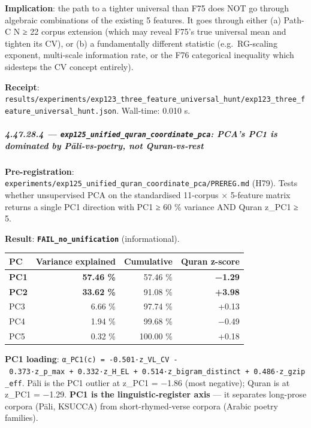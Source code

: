 \documentclass[
]{article}
\newcounter{none} %
\begin{document}
\textbf{Implication}: the path to a tighter universal than F75 does NOT
go through algebraic combinations of the existing 5 features. It goes
through either (a) Path-C N ≥ 22 corpus extension (which may reveal
F75's true universal mean and tighten its CV), or (b) a fundamentally
different statistic (e.g.~RG-scaling exponent, multi-scale information
rate, or the F76 categorical inequality which sidesteps the CV concept
entirely).

\textbf{Receipt}:
\texttt{results/experiments/exp123\_three\_feature\_universal\_hunt/exp123\_three\_feature\_universal\_hunt.json}.
Wall-time: 0.010 s.

\subparagraph{\texorpdfstring{4.47.28.4 ---
\texttt{exp125\_unified\_quran\_coordinate\_pca}: PCA's PC1 is dominated
by Pāli-vs-poetry, not
Quran-vs-rest}{4.47.28.4 --- exp125\_unified\_quran\_coordinate\_pca: PCA's PC1 is dominated by Pāli-vs-poetry, not Quran-vs-rest}}\label{exp125_unified_quran_coordinate_pca-pcas-pc1-is-dominated-by-pux101li-vs-poetry-not-quran-vs-rest}

\textbf{Pre-registration}:
\texttt{experiments/exp125\_unified\_quran\_coordinate\_pca/PREREG.md}
(H79). Tests whether unsupervised PCA on the standardised 11-corpus ×
5-feature matrix returns a single PC1 direction with PC1 ≥ 60 \%
variance AND Quran \textbar z\textbar\_PC1 ≥ 5.

\textbf{Result}: \textbf{\texttt{FAIL\_no\_unification}}
(informational).

{\def\LTcaptype{none} %
\begin{longtable}[]{@{}lrrr@{}}
\toprule\noalign{}
PC & Variance explained & Cumulative & Quran z-score \\
\midrule\noalign{}
\endhead
\bottomrule\noalign{}
\endlastfoot
\textbf{PC1} & \textbf{57.46 \%} & 57.46 \% & \textbf{−1.29} \\
\textbf{PC2} & \textbf{33.62 \%} & 91.08 \% & \textbf{+3.98} \\
PC3 & 6.66 \% & 97.74 \% & +0.13 \\
PC4 & 1.94 \% & 99.68 \% & −0.49 \\
PC5 & 0.32 \% & 100.00 \% & +0.18 \\
\end{longtable}
}

\textbf{PC1 loading}:
\texttt{α\_PC1(c)\ =\ -0.501·z\_VL\_CV\ -\ 0.373·z\_p\_max\ +\ 0.332·z\_H\_EL\ +\ 0.514·z\_bigram\_distinct\ +\ 0.486·z\_gzip\_eff}.
Pāli is the PC1 outlier at z\_PC1 = −1.86 (most negative); Quran is at
z\_PC1 = −1.29. \textbf{PC1 is the linguistic-register axis} --- it
separates long-prose corpora (Pāli, KSUCCA) from short-rhymed-verse
corpora (Arabic poetry families).
\end{document}
